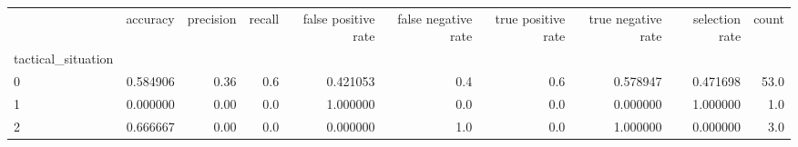 \begin{tabular}{lrrrrrrrrr}
\toprule
{} &  accuracy &  precision &  recall &  false positive rate &  false negative rate &  true positive rate &  true negative rate &  selection rate &  count \\
tactical\_situation &           &            &         &                      &                      &                     &                     &                 &        \\
\midrule
0                  &  0.584906 &       0.36 &     0.6 &             0.421053 &                  0.4 &                 0.6 &            0.578947 &        0.471698 &   53.0 \\
1                  &  0.000000 &       0.00 &     0.0 &             1.000000 &                  0.0 &                 0.0 &            0.000000 &        1.000000 &    1.0 \\
2                  &  0.666667 &       0.00 &     0.0 &             0.000000 &                  1.0 &                 0.0 &            1.000000 &        0.000000 &    3.0 \\
\bottomrule
\end{tabular}

